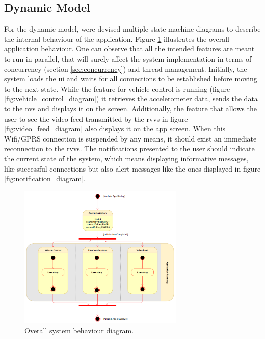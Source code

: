 \subsection{Dynamic Model}
For the dynamic model, were devised multiple state-machine diagrams to describe the internal behaviour of the application. 
%
Figure \ref{fig:overall_system_diagram} illustrates the overall application behaviour. One can observe that all the intended features are meant to run in parallel, that will surely affect the system implementation in terms of concurrency (section \ref{sec:concurrency}) and thread management.
%
Initially, the system loads the \gls{ui} and waits for all connections to be established before moving to the next state.
%
While the feature for vehicle control is running (figure \ref{fig:vehicle_control_diagram}) it retrieves the accelerometer data, sends the data to the \gls{nvs} and displays it on the screen.
%
Additionally, the feature that allows the user to see the video feed transmitted by the \gls{rvvs} in figure \ref{fig:video_feed_diagram} also displays it on the app screen. When this Wifi/GPRS connection is suspended by any means, it should exist an immediate reconnection to the \gls{rvvs}.
%
The notifications presented to the user should indicate the current state of the system, which means displaying informative messages, like successful connections but also alert messages like the ones displayed in figure \ref{fig:notification_diagram}.
%
\begin{figure}[!ht]
\centering
\includegraphics[width=0.7\textwidth]{img/overall_system_sm.png}
\caption{\label{fig:overall_system_diagram}Overall system behaviour diagram.}
\end{figure}
%
